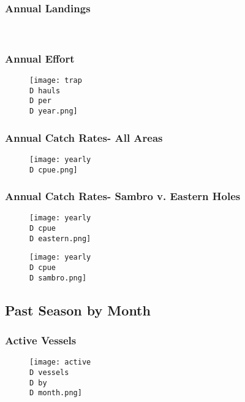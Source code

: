 \begin{frame}
\frametitle{Annual Landings}
\begin{figure}
\centering
 \
\end{figure}
\end{frame}

\begin{frame}
\frametitle{Annual Effort}
\begin{figure}

 \centerline{\texttt{[image: trap\\D hauls\\D per\\D year.png]}}
 \end{figure}
\end{frame}



%
%
\begin{frame}
\frametitle{Annual Catch Rates- All Areas}
\begin{figure}
 \centerline{\texttt{[image: yearly\\D cpue.png]}}

 \end{figure}
\end{frame}


\begin{frame}
\frametitle{Annual Catch Rates- Sambro v. Eastern Holes}
\begin{figure}
 \centerline{\texttt{[image: yearly\\D cpue\\D eastern.png]}}
 \centerline{\texttt{[image: yearly\\D cpue\\D sambro.png]}}

 \end{figure}
\end{frame}

\subsection{Past Season by Month}
\begin{frame}
\frametitle{Active Vessels}
\begin{figure}
%

 \centerline{\texttt{[image: active\\D vessels\\D by\\D month.png]}}

 \end{figure}
\end{frame}

%
%

